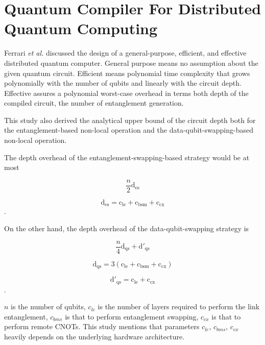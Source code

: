 \section{Quantum Compiler For Distributed Quantum Computing}

Ferrari \textit{et al.}  \cite{distributedquantumcompiler} discussed the design of a general-purpose, efficient, and effective distributed quantum computer. General purpose means no assumption about the given quantum circuit. Efficient means polynomial time complexity that grows polynomially with the number of qubits and linearly with the circuit depth.  Effective assures a polynomial worst-case overhead in terms both depth of the compiled circuit, the number of entanglement generation.

 This study also derived the analytical upper bound of the circuit depth both for the entanglement-based non-local operation and the data-qubit-swapping-based non-local operation.
 
 The depth overhead of the entanglement-swapping-based strategy would be at most 
 
  \begin{equation}
\frac{n}{2} \operatorname{d_{es}}
  \end{equation}
  
 \begin{equation}
  \operatorname{d_{es}} =  \operatorname{c_{le}} +  \operatorname{c_{bsm}} +  \operatorname{c_{cx}}
  \end{equation}.
 
  On the other hand, the depth overhead of the data-qubit-swapping strategy is
  
   \begin{equation} 
  \frac{n}{4} \operatorname{d_{qs}} +  \operatorname{d'_{qs}}
   \end{equation} 
   
   \begin{equation} 
    \operatorname{d_{qs}}= 3( \operatorname{c_{le}} +  \operatorname{c_{bsm}} +  \operatorname{c_{cx}})
    \end{equation}
    
  \begin{equation}
    \operatorname{d'_{qs}} =  \operatorname{c_{le}} + \operatorname{ c_{cx}}
   \end{equation}.
  
  $n$ is the number of qubits, $c_{le}$ is the number of layers required to perform the link entanglement, $c_{bms}$ is that to perform entanglement swapping, $c_{cx}$ is that to perform remote CNOTs.
  This study mentions that parameters $c_{le}$, $c_{bms}$, $c_{cx}$ heavily depends on the underlying hardware architecture.
  
